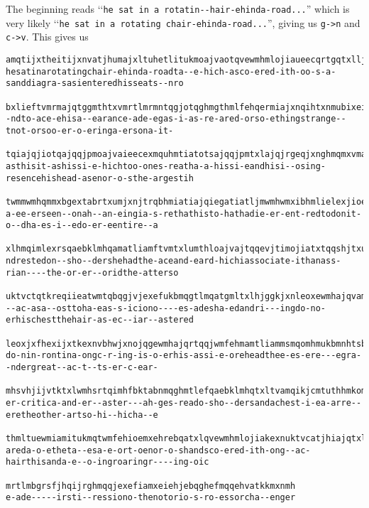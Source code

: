 The beginning reads
\lq\lq\verb!he sat in a rotatin--hair-ehinda-road...!''
which is very likely
\lq\lq\verb!he sat in a rotating chair-ehinda-road...!'',
giving us
\verb!g->n! and \verb!c->v!.
This gives us
  \begin{Verbatim}[frame=single,fontsize=\tiny]
amqtijxtheitijxnvatjhumajxltuhetlitukmoajvaotqvewmhmlojiaueecqrtgqtxlljtnhtrqtqjmximhmlajqqmtiqgbxhe
hesatinarotatingchair-ehinda-roadta--e-hich-asco-ered-ith-oo-s-a-sanddiagra-sasienteredhisseats--nro

bxlieftvmrmajqtggmthtxvmrtlmrmntqgjotqghmgthmlfehqermiajxnqihtxnmubixeifehqeewmhgeomhjxntgmhqextkjis
-ndto-ace-ehisa--earance-ade-egas-i-as-re-ared-orso-ethingstrange--tnot-orsoo-er-o-eringa-ersona-it-

tqiajqjiotqajqqjpmoajvaieecexmquhmtiatotsajqqjpmtxlajqjrgeqjxnghmqmxvmajqamtlotqmxehrebqiamkthnmqija
asthisit-ashissi-e-hichtoo-ones-reatha-a-hissi-eandhisi--osing-resencehishead-asenor-o-sthe-argestih

twmmwmhqmmxbgextabrtxumjxnjtrqbhmiatiajqiegatiatljmwmhwmxibhmlielexjioebklatwmqkjggmlewmhrmmxijhmkst
a-ee-erseen--onah--an-eingia-s-rethathisto-hathadie-er-ent-redtodonit-o--dha-es-i--edo-er-eentire--a

xlhmqimlexrsqaebklmhqamatliamftvmtxlumthloajvajtqqevjtimojiatxtqqshjtxubkkiamfehrmhfkehjliamktiimhqe
ndrestedon--sho--dershehadthe-aceand-eard-hichiassociate-ithanass-rian----the-or-er--oridthe-atterso

uktvctqtkreqiieatwmtqbqgjvjexefukbmqgtlmqatgmltxlhjggkjxnleoxewmhajqvamqiiamatjhotqgmvbkjthgktqimhml
--ac-asa--osttoha-eas-s-iciono----es-adesha-edandri---ingdo-no-erhischestthehair-as-ec--iar--astered

leoxjxfhexijxtkexnvbhwjxnojqgewmhajqrtqqjwmfehmamtliammsmqomhmukbmnhtsbxlmhnhmtiuktvcibfiqwmhsvkmthw
do-nin-rontina-ongc-r-ing-is-o-erhis-assi-e-oreheadthee-es-ere---egra--ndergreat--ac-t--ts-er-c-ear-

mhsvhjijvtktxlwmhsrtqimhfbktabnmqghmtlefqaebklmhqtxltvamqikjcmtuthhmkomhmiameiamhgthiqefajroajvatggm
er-critica-and-er--aster---ah-ges-reado-sho--dersandachest-i-ea-arre--eretheother-artso-hi--hicha--e

thmltuewmiamitukmqtwmfehioemxehrebqatxlqvewmhmlojiakexnuktvcatjhiajqtxltumkkeojxnhethjxnhbrukjxnwejv
areda-o-etheta--esa-e-ort-oenor-o-shandsco-ered-ith-ong--ac-hairthisanda-e--o-ingroaringr----ing-oic

mrtlmbgrsfjhqijrghmqqjexefiamxeiehjebqghefmqqehvatkkmxnmh
e-ade-----irsti--ressiono-thenotorio-s-ro-essorcha--enger


\end{Verbatim}
